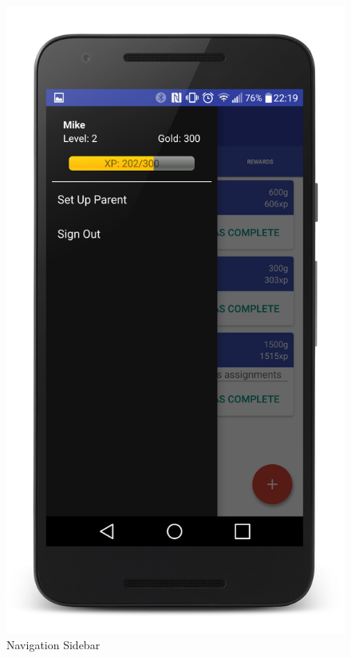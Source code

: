 \begin{figure}[ht]
\begin{minipage}[b]{0.45\linewidth}
    \includegraphics[width=.8\linewidth]{../images/Screenshot/NavigationBar.jpg}
    \caption{Navigation Sidebar} 
    \vspace{4ex}
  \end{minipage} 
  \begin{minipage}[b]{0.45\linewidth}
    \centering

\end{minipage}
\end{figure}
